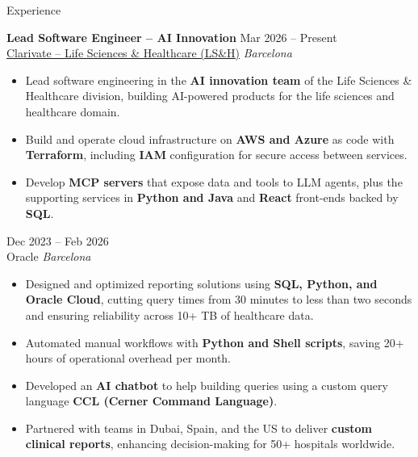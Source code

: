 \documentclass{resume} %
\begin{document}
\begin{rSection}{Experience}
\hypersetup{hidelinks}

\textbf{Lead Software Engineer -- AI Innovation} \hfill Mar 2026 – Present \\
\href{https://clarivate.com/}{Clarivate -- Life Sciences \& Healthcare (LS\&H)} \hfill \textit{Barcelona}
\vspace{-0.5em}
\begin{itemize}
    \itemsep -3pt {}
    \item Lead software engineering in the \textbf{AI innovation team} of the Life Sciences \& Healthcare division, building AI-powered products for the life sciences and healthcare domain.
    \item Build and operate cloud infrastructure on \textbf{AWS and Azure} as code with \textbf{Terraform}, including \textbf{IAM} configuration for secure access between services.
    \item Develop \textbf{MCP servers} that expose data and tools to LLM agents, plus the supporting services in \textbf{Python and Java} and \textbf{React} front-ends backed by \textbf{SQL}.
\end{itemize}

 \hfill Dec 2023 – Feb 2026 \\
Oracle \hfill \textit{Barcelona}
\vspace{-0.5em}
\begin{itemize}
    \itemsep -3pt {}
    \item Designed and optimized reporting solutions using \textbf{SQL, Python, and Oracle Cloud}, cutting query times from 30 minutes to less than two seconds and ensuring reliability across 10+ TB of healthcare data.
    \item Automated manual workflows with \textbf{Python and Shell scripts}, saving 20+ hours of operational overhead per month.
    \item Developed an \textbf{AI chatbot} to help building queries using a custom query language \textbf{CCL (Cerner Command Language)}.
    \item Partnered with teams in Dubai, Spain, and the US to deliver \textbf{custom clinical reports}, enhancing decision-making for 50+ hospitals worldwide.
\end{itemize}


\end{rSection}
\end{document}
